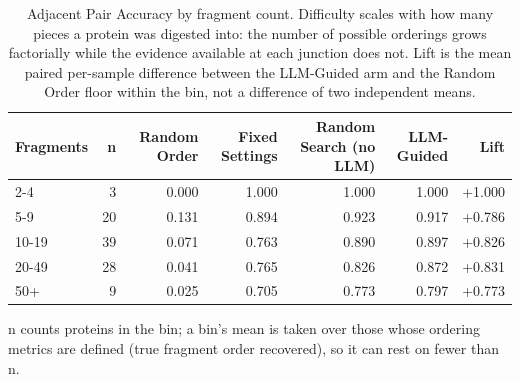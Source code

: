 \begin{table}[!t]
  \centering
  \caption{Adjacent Pair Accuracy by fragment count. Difficulty scales with how many pieces a protein was digested into: the number of possible orderings grows factorially while the evidence available at each junction does not. Lift is the mean paired per-sample difference between the LLM-Guided arm and the Random Order floor within the bin, not a difference of two independent means.}
  \label{tab:stratification}
  \begin{tabular}{lrrrrrr}
    \toprule
    Fragments & n & Random Order & Fixed Settings & Random Search (no LLM) & LLM-Guided & Lift \\
    \midrule
    2-4 & 3 & 0.000 & 1.000 & 1.000 & 1.000 & +1.000 \\
    5-9 & 20 & 0.131 & 0.894 & 0.923 & 0.917 & +0.786 \\
    10-19 & 39 & 0.071 & 0.763 & 0.890 & 0.897 & +0.826 \\
    20-49 & 28 & 0.041 & 0.765 & 0.826 & 0.872 & +0.831 \\
    50+ & 9 & 0.025 & 0.705 & 0.773 & 0.797 & +0.773 \\
    \bottomrule
  \end{tabular}
  \par\smallskip\footnotesize{n counts proteins in the bin; a bin's mean is taken over those whose ordering metrics are defined (true fragment order recovered), so it can rest on fewer than n.}
\end{table}
